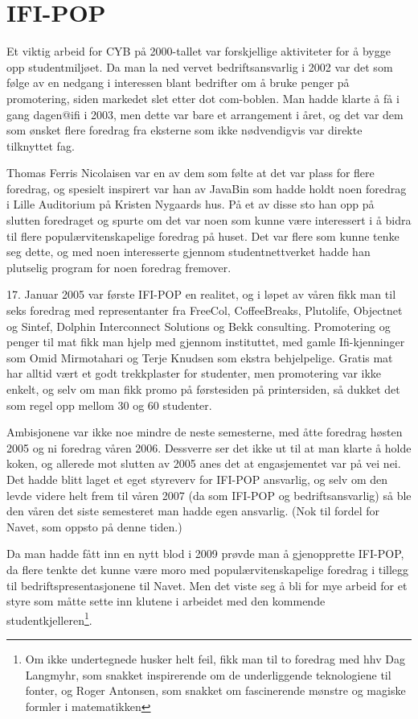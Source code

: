 \chapter{IFI-POP}

\author{Skrevet av Arne Hassel, godt hjulpet av Thomas Ferris Nicolaisen}

Et viktig arbeid for CYB på 2000-tallet var forskjellige aktiviteter for å bygge opp studentmiljøet. Da man la ned vervet bedriftsansvarlig i 2002 var det som følge av en nedgang i interessen blant bedrifter om å bruke penger på promotering, siden markedet slet etter dot com-boblen. Man hadde klarte å få i gang dagen@ifi i 2003, men dette var bare et arrangement i året, og det var dem som ønsket flere foredrag fra eksterne som ikke nødvendigvis var direkte tilknyttet fag.

Thomas Ferris Nicolaisen var en av dem som følte at det var plass for flere foredrag, og spesielt inspirert var han av JavaBin som hadde holdt noen foredrag i Lille Auditorium på Kristen Nygaards hus. På et av disse sto han opp på slutten foredraget og spurte om det var noen som kunne være interessert i å bidra til flere populærvitenskapelige foredrag på huset. Det var flere som kunne tenke seg dette, og med noen interesserte gjennom studentnettverket hadde han plutselig program for noen foredrag fremover.

17. Januar 2005 var første IFI-POP en realitet, og i løpet av våren fikk man til seks foredrag med representanter fra FreeCol, CoffeeBreaks, Plutolife, Objectnet og Sintef, Dolphin Interconnect Solutions og Bekk consulting. Promotering og penger til mat fikk man hjelp med gjennom instituttet, med gamle Ifi-kjenninger som Omid Mirmotahari og Terje Knudsen som ekstra behjelpelige. Gratis mat har alltid vært et godt trekkplaster for studenter, men promotering var ikke enkelt, og selv om man fikk promo på førstesiden på printersiden, så dukket det som regel opp mellom 30 og 60 studenter.

Ambisjonene var ikke noe mindre de neste semesterne, med åtte foredrag høsten 2005 og ni foredrag våren 2006. Dessverre ser det ikke ut til at man klarte å holde koken, og allerede mot slutten av 2005 anes det at engasjementet var på vei nei. Det hadde blitt laget et eget styreverv for IFI-POP ansvarlig, og selv om den levde videre helt frem til våren 2007 (da som IFI-POP og bedriftsansvarlig) så ble den våren det siste semesteret man hadde egen ansvarlig. (Nok til fordel for Navet, som oppsto på denne tiden.)

Da man hadde fått inn en nytt blod i 2009 prøvde man å gjenopprette IFI-POP, da flere tenkte det kunne være moro med populærvitenskapelige foredrag i tillegg til bedriftspresentasjonene til Navet. Men det viste seg å bli for mye arbeid for et styre som måtte sette inn klutene i arbeidet med den kommende studentkjelleren\footnote{Om ikke undertegnede husker helt feil, fikk man til to foredrag med hhv Dag Langmyhr, som snakket inspirerende om de underliggende teknologiene til fonter, og Roger Antonsen, som snakket om fascinerende mønstre og magiske formler i matematikken}.

